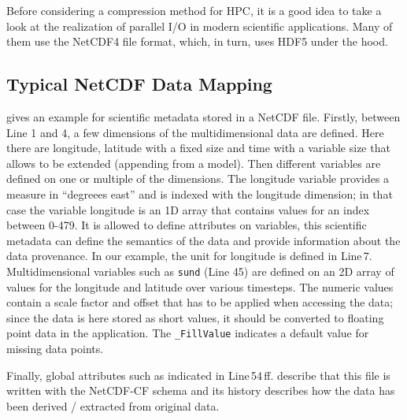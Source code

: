 \documentclass{../../template/esiwace-report}
\begin{document}
Before considering a compression method for HPC, it is a good idea to take a look at the realization of parallel I/O in modern scientific applications.
Many of them use the NetCDF4 file format, which, in turn, uses HDF5 under the hood.
 
\subsection{Typical NetCDF Data Mapping}
\label{sec:netcdfDataMapping}
 gives an example for scientific metadata stored in a NetCDF file.
Firstly, between Line 1 and 4, a few dimensions of the multidimensional data are defined.
Here there are longitude, latitude with a fixed size and time with a variable size that allows to be extended (appending from a model).
Then different variables are defined on one or multiple of the dimensions.
The longitude variable provides a measure in “degreees east” and is indexed with the longitude dimension; in that case the variable longitude is an 1D array that contains values for an index between 0-479. 
It is allowed to define attributes on variables, this scientific metadata can define the semantics of the data and provide information about the data provenance.
In our example, the unit for longitude is defined in Line\,7.
Multidimensional variables such as \texttt{sund} (Line 45) are defined on an 2D array of values for the longitude and latitude over various timesteps.
The numeric values contain a scale factor and offset that has to be applied when accessing the data; since the data is here stored as short values, it should be converted to floating point data in the application.
The \texttt{\_FillValue} indicates a default value for missing data points.

Finally, global attributes such as indicated in Line\,54\,ff. describe that this file is written with the NetCDF-CF schema and its history describes how the data has been derived / extracted from original data.
\end{document}
